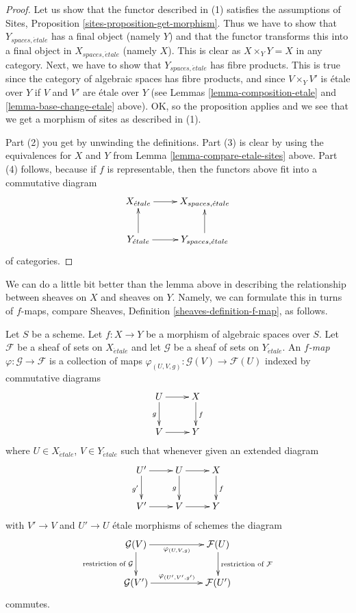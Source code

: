 \begin{proof}
Let us show that the functor described in (1) satisfies the assumptions
of Sites, Proposition \ref{sites-proposition-get-morphism}.
Thus we have to show that
$Y_{spaces, \acute{e}tale}$ has a final object (namely $Y$) and that
the functor transforms this into a final object in $X_{spaces, \acute{e}tale}$
(namely $X$). This is clear as $X \times_Y Y = X$ in any category.
Next, we have to show that $Y_{spaces, \acute{e}tale}$ has fibre products.
This is true since the category of algebraic spaces has fibre products,
and since $V \times_Y V'$ is \'etale over $Y$ if $V$ and $V'$ are \'etale
over $Y$ (see Lemmas \ref{lemma-composition-etale} and
\ref{lemma-base-change-etale} above).
OK, so the proposition applies and we see that we get a morphism
of sites as described in (1).

\medskip\noindent
Part (2) you get by unwinding the definitions.
Part (3) is clear by using the equivalences for $X$ and $Y$
from Lemma \ref{lemma-compare-etale-sites} above.
Part (4) follows, because if $f$ is representable, then the
functors above fit into a commutative diagram
$$
\xymatrix{
X_{\acute{e}tale} \ar[r] &
X_{spaces, \acute{e}tale} \\
Y_{\acute{e}tale} \ar[r] \ar[u] &
Y_{spaces, \acute{e}tale} \ar[u]
}
$$
of categories.
\end{proof}

\noindent
We can do a little bit better than the lemma above in describing
the relationship between sheaves on $X$ and sheaves on $Y$.
Namely, we can formulate this in turns of $f$-maps, compare
Sheaves, Definition \ref{sheaves-definition-f-map}, as follows.

\begin{definition}
\label{definition-f-map}
Let $S$ be a scheme.
Let $f : X \to Y$ be a morphism of algebraic spaces over $S$.
Let $\mathcal{F}$ be a sheaf of sets on $X_{\acute{e}tale}$ and
let $\mathcal{G}$ be a sheaf of sets on $Y_{\acute{e}tale}$.
An {\it $f$-map $\varphi : \mathcal{G} \to \mathcal{F}$}
is a collection of maps
$\varphi_{(U,V,g)} : \mathcal{G}(V) \to \mathcal{F}(U)$
indexed by commutative diagrams
$$
\xymatrix{
U \ar[d]_g \ar[r] & X \ar[d]^f \\
V \ar[r] & Y
}
$$
where $U \in X_{\acute{e}tale}$, $V \in Y_{\acute{e}tale}$ such that whenever
given an extended diagram
$$
\xymatrix{
U' \ar[r] \ar[d]_{g'} & U \ar[d]_g \ar[r] & X \ar[d]^f \\
V' \ar[r] & V \ar[r] & Y
}
$$
with $V' \to V$ and $U' \to U$ \'etale morphisms of schemes the diagram
$$
\xymatrix{
\mathcal{G}(V)
\ar[rr]_{\varphi_{(U, V, g)}}
\ar[d]_{\text{restriction of }\mathcal{G}} & &
\mathcal{F}(U)
\ar[d]^{\text{restriction of }\mathcal{F}} \\
\mathcal{G}(V')
\ar[rr]^{\varphi_{(U', V', g')}} & &
\mathcal{F}(U')
}
$$
commutes.
\end{definition}

